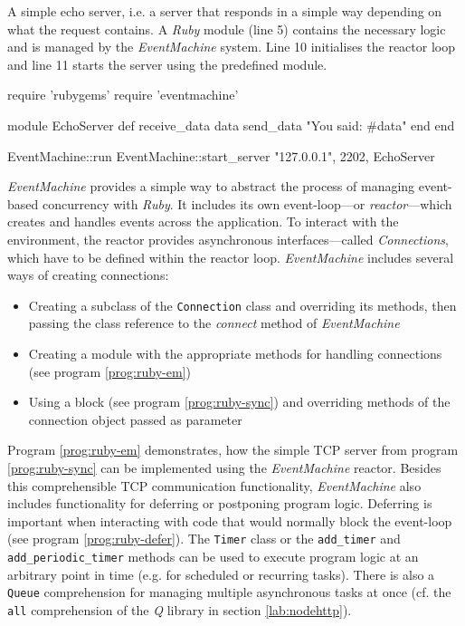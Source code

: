 \begin{program}
  \caption{A simple echo server, i.e. a server that responds in a simple way depending on what the request contains. A \textit{Ruby} module (line 5) contains the necessary logic and is managed by the \textit{EventMachine} system. Line 10 initialises the reactor loop and line 11 starts the server using the predefined module.}
  \label{prog:ruby-em}
  \begin{JavaCode}
require 'rubygems'
require 'eventmachine'

module EchoServer
    def receive_data data
        send_data "You said: #{data}"
    end
end

EventMachine::run {
    EventMachine::start_server "127.0.0.1", 2202, EchoServer
}
  \end{JavaCode}
\end{program}

\textit{EventMachine} provides a simple way to abstract the process of managing event-based concurrency with \textit{Ruby}. It includes its own event-loop---or \textit{reactor}---which creates and handles events across the application. To interact with the environment, the reactor provides asynchronous interfaces---called \textit{Connections}, which have to be defined within the reactor loop. \textit{EventMachine} includes several ways of creating connections:

\begin{itemize}
  \item Creating a subclass of the \texttt{Connection} class and overriding its methods, then passing the class reference to the \textit{connect} method of \textit{EventMachine}
  \item Creating a module with the appropriate methods for handling connections (see program \ref{prog:ruby-em})
  \item Using a block (see program \ref{prog:ruby-sync}) and overriding methods of the connection object passed as parameter
\end{itemize}
Program \ref{prog:ruby-em} demonstrates, how the simple TCP server from program \ref{prog:ruby-sync} can be implemented using the \textit{EventMachine} reactor. Besides this comprehensible TCP communication functionality, \textit{EventMachine} also includes functionality for deferring or postponing program logic. Deferring is important when interacting with code that would normally block the event-loop (see program \ref{prog:ruby-defer}). The \texttt{Timer} class or the \texttt{add\_timer} and \texttt{add\_periodic\_timer} methods can be used to execute program logic at an arbitrary point in time (e.g. for scheduled or recurring tasks). There is also a \texttt{Queue} comprehension for managing multiple asynchronous tasks at once (cf. the \texttt{all} comprehension of the \textit{Q} library in section \ref{lab:nodehttp}). 

